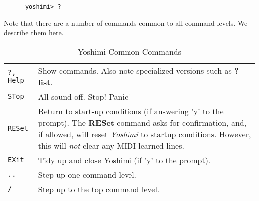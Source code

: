    \begin{verbatim}
      yoshimi> ?
   \end{verbatim}

   Note that there are a number of commands common to all command levels.
   We describe them here.


\begin{center}
\begin{longtable}{p{2cm} p{10cm}}
\caption[Yoshimi Common Commands]{Yoshimi Common Commands} \\

\texttt{?,  Help} &
   Show commands.  Also note specialized versions such as \textbf{? list}. \\
\texttt{STop} &
   All sound off.  Stop!  Panic! \\
\texttt{RESet} &
   Return to start-up conditions (if answering 'y' to the prompt).
   The \textbf{RESet} command asks for confirmation, and, if allowed, will
   reset \textsl{Yoshimi} to startup conditions.
   However, this will \textsl{not} clear any MIDI-learned lines. \\
\texttt{EXit} &
   Tidy up and close Yoshimi (if 'y' to the prompt). \\
\texttt{..} &
   Step up one command level. \\
\texttt{/} &
   Step up to the top command level. \\

\end{longtable}
\end{center}



